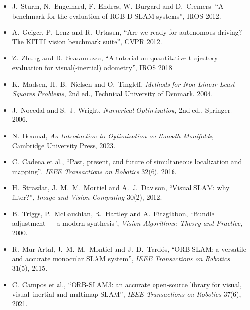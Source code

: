 \begin{description}[leftmargin=1.5em,style=nextline,font=\normalfont]
\begin{itemize}[nosep]
{  Applications to Tracking and Navigation}, Wiley, 2001.
\item J.~Sturm, N.~Engelhard, F.~Endres, W.~Burgard and D.~Cremers, ``A
  benchmark for the evaluation of RGB-D SLAM systems'', IROS 2012.
\item A.~Geiger, P.~Lenz and R.~Urtasun, ``Are we ready for autonomous
  driving? The KITTI vision benchmark suite'', CVPR 2012.
\item Z.~Zhang and D.~Scaramuzza, ``A tutorial on quantitative trajectory
  evaluation for visual(-inertial) odometry'', IROS 2018.
\end{itemize}
\item[Optimisation]
\begin{itemize}[nosep]
\item K.~Madsen, H.~B.~Nielsen and O.~Tingleff, \emph{Methods for
  Non-Linear Least Squares Problems}, 2nd ed., Technical University of
  Denmark, 2004.
\item J.~Nocedal and S.~J.~Wright, \emph{Numerical Optimization}, 2nd
  ed., Springer, 2006.
\item N.~Boumal, \emph{An Introduction to Optimization on Smooth
  Manifolds}, Cambridge University Press, 2023.
\end{itemize}
\item[SLAM: surveys and landmark systems]
\begin{itemize}[nosep]
\item C.~Cadena et al., ``Past, present, and future of simultaneous
  localization and mapping'', \emph{IEEE Transactions on Robotics}
  32(6), 2016.
\item H.~Strasdat, J.~M.~M.~Montiel and A.~J.~Davison, ``Visual SLAM:
  why filter?'', \emph{Image and Vision Computing} 30(2), 2012.
\item B.~Triggs, P.~McLauchlan, R.~Hartley and A.~Fitzgibbon, ``Bundle
  adjustment --- a modern synthesis'', \emph{Vision Algorithms: Theory
  and Practice}, 2000.
\item R.~Mur-Artal, J.~M.~M.~Montiel and J.~D.~Tard\'os, ``ORB-SLAM: a
  versatile and accurate monocular SLAM system'', \emph{IEEE Transactions
  on Robotics} 31(5), 2015.
\item C.~Campos et al., ``ORB-SLAM3: an accurate open-source library for
  visual, visual--inertial and multimap SLAM'', \emph{IEEE Transactions
  on Robotics} 37(6), 2021.
\end{itemize}
\item[Visual--inertial]
\begin{itemize}[nosep]

\end{itemize}
\end{description}
